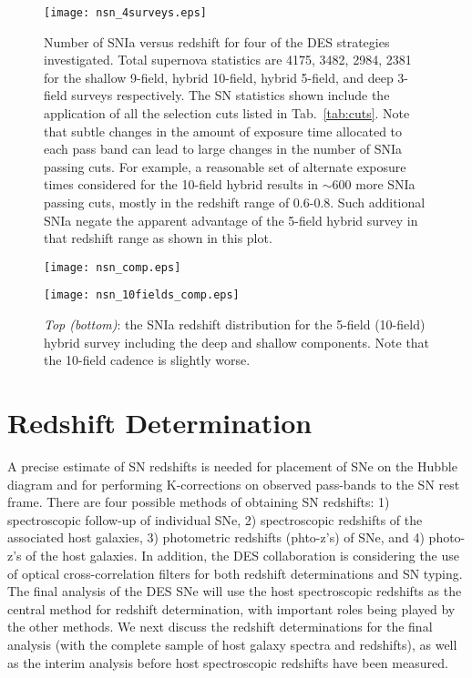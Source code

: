 \documentclass[preprint2]{aastex}    %
\begin{document}
\onecolumn
\begin{figure}[ht]
\centerline{\texttt{[image: nsn\_4surveys.eps]}}
\caption{Number of SNIa versus redshift for four of the DES strategies 
investigated. Total supernova statistics are 4175, 3482, 2984, 2381 for
the shallow 9-field, hybrid 10-field, hybrid 5-field, and 
deep 3-field surveys respectively. The SN statistics shown include the
application of all the selection cuts listed in Tab.~\ref{tab:cuts}.
Note that subtle changes in the amount of exposure time allocated to each pass 
band can lead to large changes in the number of SNIa passing cuts.
For example, a reasonable set of alternate exposure times considered 
for the 10-field hybrid results in $\sim$600 more SNIa passing cuts, 
mostly in the redshift range of 0.6-0.8. Such additional SNIa negate 
the apparent advantage of the 5-field hybrid survey in that redshift range 
as shown in this plot.}
\label{fig:nsn_4surveys}
\end{figure}

\begin{figure}[ht]
\centerline{\texttt{[image: nsn\_comp.eps]}}
\centerline{\texttt{[image: nsn\_10fields\_comp.eps]}}
\caption{\textit{Top (bottom)}: the SNIa redshift distribution for the 5-field (10-field) hybrid 
survey including the deep and shallow components. Note that the 10-field cadence is slightly 
worse.}
\label{fig:nsn_comp}
\end{figure}
\twocolumn

\section{Redshift Determination}\label{sec:redshift}
A precise estimate of SN redshifts is needed for placement of SNe on the Hubble 
diagram and for performing K-corrections on observed pass-bands to the SN rest frame.
There are four possible methods of obtaining SN 
redshifts: 1) spectroscopic follow-up of individual SNe, 2) spectroscopic 
redshifts of the associated host galaxies, 3) photometric redshifts (phto-z's) of SNe, and 
4) photo-z's of the host galaxies. In addition, the DES collaboration
is considering the use of optical cross-correlation filters \citep{sco09} 
for both redshift determinations and SN typing. The final analysis of the
DES SNe will use the host spectroscopic redshifts as the central method for
redshift determination, with important roles being played by the other methods.
We next discuss the redshift determinations for the final analysis (with 
the complete sample of host galaxy spectra and redshifts), as well
as the interim analysis before host spectroscopic redshifts have been measured.
\end{document}
